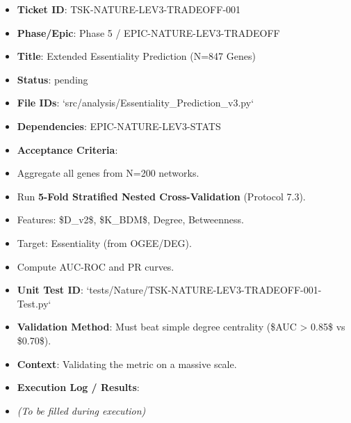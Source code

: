 \documentclass{article}
\begin{document}
\begin{itemize}
\item   \textbf{Ticket ID}: TSK-NATURE-LEV3-TRADEOFF-001
\item   \textbf{Phase/Epic}: Phase 5 / EPIC-NATURE-LEV3-TRADEOFF
\item   \textbf{Title}: Extended Essentiality Prediction (N=847 Genes)
\item   \textbf{Status}: pending
\item   \textbf{File IDs}: `src/analysis/Essentiality\_Prediction\_v3.py`
\item   \textbf{Dependencies}: EPIC-NATURE-LEV3-STATS
\item   \textbf{Acceptance Criteria}:
\item   Aggregate all genes from N=200 networks.
\item   Run \textbf{5-Fold Stratified Nested Cross-Validation} (Protocol 7.3).
\item   Features: \$\Delta D\_{v2}\$, \$\Delta K\_{BDM}\$, Degree, Betweenness.
\item   Target: Essentiality (from OGEE/DEG).
\item   Compute AUC-ROC and PR curves.
\item   \textbf{Unit Test ID}: `tests/Nature/TSK-NATURE-LEV3-TRADEOFF-001-Test.py`
\item   \textbf{Validation Method}: Must beat simple degree centrality (\$AUC > 0.85\$ vs \$0.70\$).
\item   \textbf{Context}: Validating the metric on a massive scale.
\item   \textbf{Execution Log / Results}:
\item   \textit{(To be filled during execution)}
\end{itemize}
\end{document}
